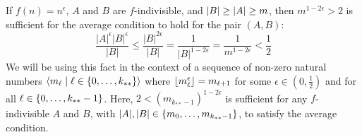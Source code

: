     \remark\label{sufficient_requirement_for_average_condition}
        If $f(n) = n^\epsilon$, $A$ and $B$ are $f$-indivisible, and $\left| B \right| \geq \left| A \right| \geq m$,
        then $m^{1-2\epsilon} > 2$ is sufficient for the average condition to hold for the pair $(A,B)$:
        \[
            \frac{|A|^\epsilon |B|^\epsilon}{|B|}
                \leq \frac{|B|^{2\epsilon}}{|B|}
                = \frac{1}{|B|^{1-2\epsilon}}
                = \frac{1}{m^{1-2\epsilon}}
                < \frac{1}{2}
        \]
        We will be using this fact in the context of a sequence of non-zero natural numbers
        $\left< m_\ell \mid \ell \in \left\{ 0, \dots, k_{**} \right\} \right>$ where $\left\lfloor m_\ell^\epsilon \right\rfloor = m_{\ell+1}$
        for some $\epsilon \in (0, \frac{1}{2})$ and for all $\ell \in \left\{ 0, \dots, k_{**}-1 \right\}$.
        Here, $2 < (m_{k_{**}-1})^{1-2\epsilon}$ is sufficient for any $f$-indivisible $A$ and $B$, with
        $|A|, |B| \in \left\{ m_0, \dots, m_{k_{**}-1} \right\}$, to satisfy the average condition.

